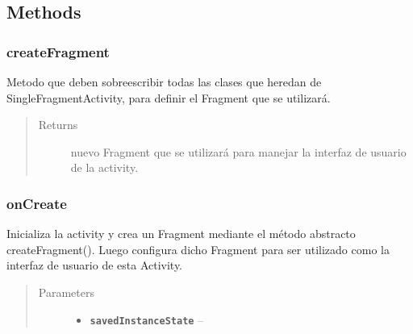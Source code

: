 \documentclass[letterpaper,10pt,english]{sphinxmanual}
\begin{document}
\subsection{Methods}
\label{Activities/SingleFragmentActivity:methods}

\subsubsection{createFragment}
\label{Activities/SingleFragmentActivity:createfragment}

\begin{fulllineitems}
\label{Activities/SingleFragmentActivity:com.fiuba.tallerii.jobify.SingleFragmentActivity.createFragment()}
Metodo que deben sobreescribir todas las clases que heredan de SingleFragmentActivity, para definir el Fragment que se utilizará.
\begin{quote}\begin{description}
\item[{Returns}] \leavevmode
nuevo Fragment que se utilizará para manejar la interfaz de usuario de la activity.

\end{description}\end{quote}

\end{fulllineitems}



\subsubsection{onCreate}
\label{Activities/SingleFragmentActivity:oncreate}

\begin{fulllineitems}
\label{Activities/SingleFragmentActivity:com.fiuba.tallerii.jobify.SingleFragmentActivity.onCreate(Bundle)}
Inicializa la activity y crea un Fragment mediante el método abstracto createFragment(). Luego configura dicho Fragment para ser utilizado como la interfaz de usuario de esta Activity.
\begin{quote}\begin{description}
\item[{Parameters}] \leavevmode\begin{itemize}
\item {} 
\textbf{\texttt{savedInstanceState}} -- 

\end{itemize}

\end{description}\end{quote}

\end{fulllineitems}
\end{document}
